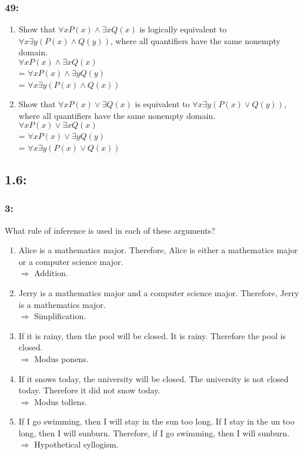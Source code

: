 \documentclass[12pt,en,a4paper]{report}
\begin{document}
	\subsubsection*{49:}
	\begin{enumerate}[label=\textbf{\alph*)}]
		\item Show that $\forall x P(x) \wedge \exists x Q(x)$ is logically equivalent to $\forall x \exists y (P(x) \wedge Q(y))$, where all quantifiers have the same nonempty domain.\\
		
		$\forall x P(x) \wedge \exists xQ(x)$\\
		= $\forall x P(x) \wedge \exists y Q(y)$\\
		= $\forall x \exists y (P(x) \wedge Q(x))$
		\item Show that $\forall x P(x) \vee \exists Q(x)$ is equivalent to $\forall x \exists y (P(x) \vee Q(y))$, where all quantifiers have the same nonempty domain.\\
		
		$\forall x P(x) \vee \exists x Q(x)$\\
		= $\forall x P(x) \vee \exists y Q(y)$\\
		= $\forall x \exists y (P(x) \vee Q(x))$
		\end{enumerate}
\newpage
{}
	\subsection*{1.6:}
	\subsubsection*{3:}
	What rule of inference is used in each of these arguments?
	\begin{enumerate}[label=\textbf{\alph*)}]
		\item Alice is a mathematics major. Therefore, Alice is either a mathematics major or a computer science major.\\
		$\Rightarrow$ Addition.
		\item Jerry is a mathematics major and a computer science major. Therefore, Jerry is a mathematics major.\\
		$\Rightarrow$ Simplification.
		\item If it is rainy, then the pool will be closed. It is rainy. Therefore the pool is closed.\\
		$\Rightarrow$ Modus ponens.
		\item If it snows today, the university will be closed. The university is not closed today. Therefore it did not snow today.\\
		$\Rightarrow$ Modus tollens.
		\item If I go swimming, then I will stay in the sun too long. If I stay in the un too long, then I will sunburn. Therefore, if I go swimming, then I will sunburn.\\
		$\Rightarrow$ Hypothetical syllogism.
	\end{enumerate}
\end{document}
